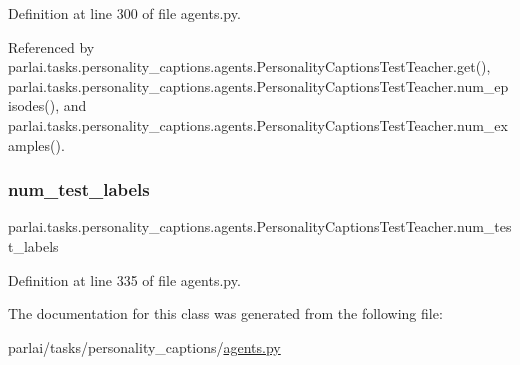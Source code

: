 Definition at line 300 of file agents.\+py.



Referenced by parlai.\+tasks.\+personality\+\_\+captions.\+agents.\+Personality\+Captions\+Test\+Teacher.\+get(), parlai.\+tasks.\+personality\+\_\+captions.\+agents.\+Personality\+Captions\+Test\+Teacher.\+num\+\_\+episodes(), and parlai.\+tasks.\+personality\+\_\+captions.\+agents.\+Personality\+Captions\+Test\+Teacher.\+num\+\_\+examples().

\mbox{\label{classparlai_1_1tasks_1_1personality__captions_1_1agents_1_1PersonalityCaptionsTestTeacher_aa2232ceb48d0dd2f67e8f15ac0a549e0}} 
\subsubsection{\texorpdfstring{num\+\_\+test\+\_\+labels}{num\_test\_labels}}
{\footnotesize\ttfamily parlai.\+tasks.\+personality\+\_\+captions.\+agents.\+Personality\+Captions\+Test\+Teacher.\+num\+\_\+test\+\_\+labels}



Definition at line 335 of file agents.\+py.



The documentation for this class was generated from the following file\+:\begin{DoxyCompactItemize}
\item 
parlai/tasks/personality\+\_\+captions/\hyperlink{parlai_2tasks_2personality__captions_2agents_8py}{agents.\+py}\end{DoxyCompactItemize}
